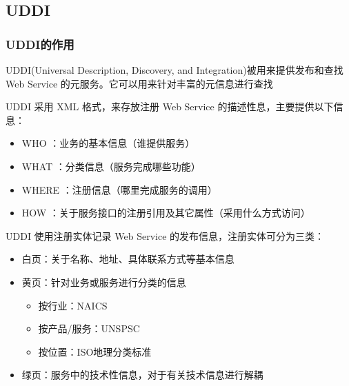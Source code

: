 \subsection{UDDI}

\subsubsection{UDDI的作用}
UDDI(Universal Description, Discovery, and Integration)被用来提供发布和查找 Web Service 的元服务。它可以用来针对丰富的元信息进行查找

UDDI 采用 XML 格式，来存放注册 Web Service 的描述性息，主要提供以下信息：
\vspace{-0.8em}
\begin{multicols}{2}
    \begin{itemize}
        \item WHO ：业务的基本信息（谁提供服务）
        \item WHAT ：分类信息（服务完成哪些功能）
        \item WHERE ：注册信息（哪里完成服务的调用）
        \item HOW ：关于服务接口的注册引用及其它属性（采用什么方式访问）
    \end{itemize}
\end{multicols}
\vspace{-1em}

UDDI 使用注册实体记录 Web Service 的发布信息，注册实体可分为三类：
\begin{itemize}
    \item 白页：关于名称、地址、具体联系方式等基本信息
    \item 黄页：针对业务或服务进行分类的信息
    \vspace{-0.8em}
    \begin{multicols}{3}
        \begin{itemize}
        \item 按行业：NAICS
        \item 按产品/服务：UNSPSC
        \item 按位置：ISO地理分类标准
        \end{itemize}
    \end{multicols}
    \vspace{-1em}
    \item 绿页：服务中的技术性信息，对于有关技术信息进行解耦
\end{itemize}


